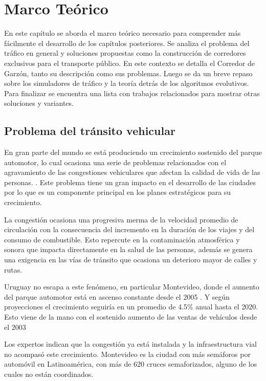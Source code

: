 \chapter{Marco Teórico}
En este capítulo se aborda el marco teórico necesario para comprender más fácilmente el desarrollo de los capítulos posteriores. Se analiza el problema del tráfico en general y soluciones propuestas como la construcción de corredores exclusivos para el transporte público. En este contexto se detalla el Corredor de Garzón, tanto su descripción como sus problemas. Luego se da un breve repaso sobre los simuladores de tráfico y la teoría detrás de los algoritmos evolutivos. Para finalizar se encuentra una lista con trabajos relacionados para mostrar otras soluciones y variantes.
\section{Problema del tránsito vehicular}

En gran parte del mundo se está produciendo un crecimiento sostenido del parque automotor, lo cual ocasiona una serie de problemas relacionados con el agravamiento de las congestiones vehiculares que afectan la calidad de vida de las personas.  \citep{Cepal2003}. Este problema tiene un gran impacto en el desarrollo de las ciudades por lo que es un componente principal en los planes estratégicos para su crecimiento.

La congestión ocasiona una progresiva merma de la velocidad promedio de circulación con la consecuencia del incremento en la duración de los viajes y del consumo de combustible. Esto repercute en la contaminación atmosférica y sonora que impacta directamente en la salud de las personas, además se genera una exigencia en las vías de tránsito que ocasiona un deterioro mayor de calles y rutas.

Uruguay no escapa a este fenómeno, en particular Montevideo, donde el aumento del parque automotor está en ascenso constante desde el 2005 \citep{INE2014}. Y según proyecciones el crecimiento seguiría en un promedio de 4.5\% anual hasta el 2020. \citep{BBVA2013} Esto viene de la mano con el sostenido aumento de las ventas de vehículos  desde el 2003 \citep{Autoanuario2014}

Los expertos indican que la congestión ya está instalada y la infraestructura vial no acompasó este crecimiento. Montevideo es la ciudad con más semáforos por automóvil en Latinoamérica, con más de 620 cruces semaforizados, alguno de los cuales no están coordinados.\citep{Subrayado2013}

